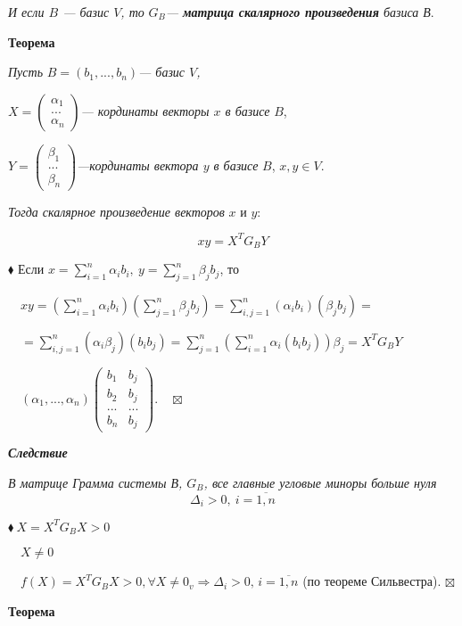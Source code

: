 \documentclass[a4paper, 12pt]{report}
\begin{document}
	\textit{И если $B$ --- базис $V$, то} $G_B$\textit{--- \textbf{матрица скалярного произведения} базиса В}.
	\par \bigskip
	\textbf{Теорема}
	
	\textit{Пусть} $ B=(b_1,...,b_n)$\textit{--- базис $V$,}
	
	$ X=\begin{pmatrix}
		\alpha_1\\
		...\\
		\alpha_n
	\end{pmatrix}$\textit{--- кординаты векторы $x$ в базисе} $B$,
	
	$ Y=\begin{pmatrix}
		\beta_1\\
		...\\
		\beta_n
	\end{pmatrix}$\textit{---кординаты вектора $y$ в базисе} $B$,
	$x,y \in V. $ 
	
	\textit{Тогда скалярное произведение векторов} $x$ и $y$:
	
	$$xy=X^T G_B Y $$
	
	$\blacklozenge$ Если $x=\sum_{i=1}^n \alpha_i b_i,\ y=\sum_{j=1}^n \beta_j b_j $, то
	
	$\quad xy=(\sum_{i=1}^n \alpha_i b_i)(\sum_{j=1}^n \beta_j b_j)= \sum_{i,j=1}^n(\alpha_i b_i)(\beta_j b_j)=$
	
	$\quad=\sum_{i,j=1}^n(\alpha_i \beta_j)(b_i b_j) =\sum_{j=1}^n (\sum_{i=1}^n \alpha_i (b_i b_j))\beta_j = X^T G_B Y$
	
	$\quad (\alpha_1,...,\alpha_n) \begin{pmatrix}
		b_1 & b_j\\
		b_2&b_j\\
		...&...\\
		b_n&b_j
	\end{pmatrix}. \quad \boxtimes$\\
	\par \bigskip
	\textit{\textbf{Следствие}}
	
	\textit{В матрице Грамма системы В, $ G_B$, все главные угловые миноры больше нуля} $$\Delta_i>0,\ i=\overline{1,n}$$
	
	$\blacklozenge\ X = X^T G_B X >0$
	
	$\quad X \ne 0$
	
	$\quad f(X)=X^T G_B X >0, \forall X \ne 0_v \Rightarrow\Delta_i >0, \, i=\overline{1,n}$
	(по теореме Сильвестра). $\boxtimes$
	\par \bigskip
	\textbf{Теорема}
	
\end{document}
